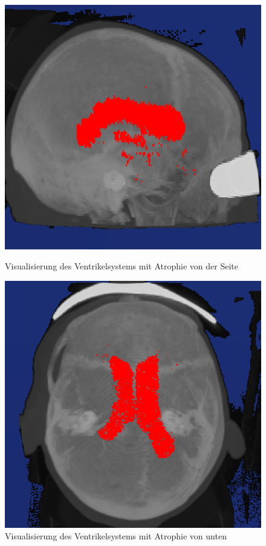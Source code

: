 \begin{figure}[H]
\begin{minipage}[b]{.5\textwidth}
  \centering
  \includegraphics[width=.9\linewidth, height=.9\linewidth]{Logos/Atrophie/Seite2.PNG}
  \caption{Visualisierung des Ventrikelsystems mit Atrophie von der Seite}
  \label{fig:atro_s}
\end{minipage}%
\begin{minipage}[b]{.5\textwidth}
  \centering
  \includegraphics[width=.9\linewidth, height=.9\linewidth]{Logos/Atrophie/Unten3.PNG}
  \caption{Visualisierung des Ventrikelsystems mit Atrophie von unten}
  \label{fig:atro_u}
\end{minipage}
\end{figure}



